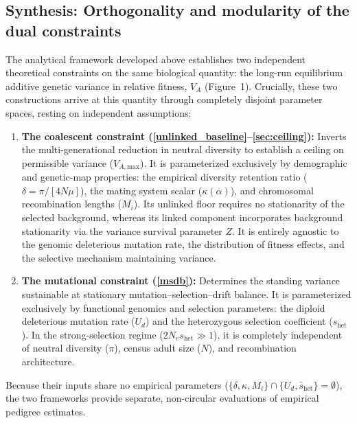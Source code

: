 \documentclass[12pt]{article}
\begin{document}
\subsection{Synthesis: Orthogonality and modularity of the dual constraints}\label{sec:breakdown}
The analytical framework developed above establishes two independent theoretical constraints on the same biological quantity: the long-run equilibrium additive genetic variance in relative fitness, $V_A$ (Figure~1). Crucially, these two constructions arrive at this quantity through completely disjoint parameter spaces, resting on independent assumptions:
\begin{enumerate}
    \item \textbf{The coalescent constraint (\autoref{unlinked_baseline}--\autoref{sec:ceiling}):} Inverts the multi-generational reduction in neutral diversity to establish a ceiling on permissible variance ($V_{A,\text{max}}$). It is parameterized exclusively by demographic and genetic-map properties: the empirical diversity retention ratio ($\delta = \pi / [4N\mu]$), the mating system scalar ($\kappa(\alpha)$), and chromosomal recombination lengths ($M_i$). Its unlinked floor requires no stationarity of the selected background, whereas its linked component incorporates background stationarity via the variance survival parameter $Z$. It is entirely agnostic to the genomic deleterious mutation rate, the distribution of fitness effects, and the selective mechanism maintaining variance.
    \item \textbf{The mutational constraint (\autoref{msdb}):} Determines the standing variance sustainable at stationary mutation--selection--drift balance. It is parameterized exclusively by functional genomics and selection parameters: the diploid deleterious mutation rate ($U_d$) and the heterozygous selection coefficient ($s_\text{het}$). In the strong-selection regime ($2N_e s_\text{het} \gg 1$), it is completely independent of neutral diversity ($\pi$), census adult size ($N$), and recombination architecture.
\end{enumerate}
Because their inputs share no empirical parameters ($\{\delta, \kappa, M_i\} \cap \{U_d, \bar{s}_\text{het}\} = \emptyset$), the two frameworks provide separate, non-circular evaluations of empirical pedigree estimates.
\end{document}
